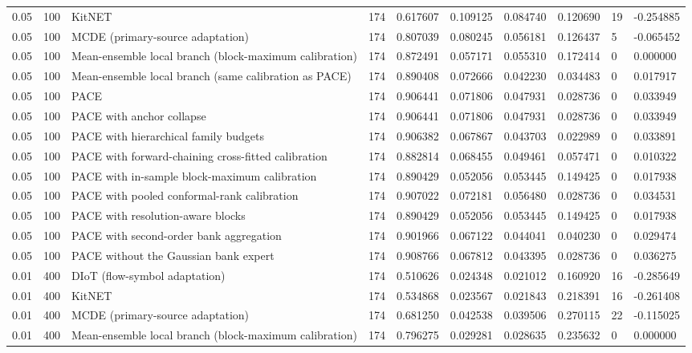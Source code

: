 \begin{tabular}{llllllllll}
0.05 & 100 & KitNET & 174 & 0.617607 & 0.109125 & 0.084740 & 0.120690 & 19 & -0.254885 \\
0.05 & 100 & MCDE (primary-source adaptation) & 174 & 0.807039 & 0.080245 & 0.056181 & 0.126437 & 5 & -0.065452 \\
0.05 & 100 & Mean-ensemble local branch (block-maximum calibration) & 174 & 0.872491 & 0.057171 & 0.055310 & 0.172414 & 0 & 0.000000 \\
0.05 & 100 & Mean-ensemble local branch (same calibration as PACE) & 174 & 0.890408 & 0.072666 & 0.042230 & 0.034483 & 0 & 0.017917 \\
0.05 & 100 & PACE & 174 & 0.906441 & 0.071806 & 0.047931 & 0.028736 & 0 & 0.033949 \\
0.05 & 100 & PACE with anchor collapse & 174 & 0.906441 & 0.071806 & 0.047931 & 0.028736 & 0 & 0.033949 \\
0.05 & 100 & PACE with hierarchical family budgets & 174 & 0.906382 & 0.067867 & 0.043703 & 0.022989 & 0 & 0.033891 \\
0.05 & 100 & PACE with forward-chaining cross-fitted calibration & 174 & 0.882814 & 0.068455 & 0.049461 & 0.057471 & 0 & 0.010322 \\
0.05 & 100 & PACE with in-sample block-maximum calibration & 174 & 0.890429 & 0.052056 & 0.053445 & 0.149425 & 0 & 0.017938 \\
0.05 & 100 & PACE with pooled conformal-rank calibration & 174 & 0.907022 & 0.072181 & 0.056480 & 0.028736 & 0 & 0.034531 \\
0.05 & 100 & PACE with resolution-aware blocks & 174 & 0.890429 & 0.052056 & 0.053445 & 0.149425 & 0 & 0.017938 \\
0.05 & 100 & PACE with second-order bank aggregation & 174 & 0.901966 & 0.067122 & 0.044041 & 0.040230 & 0 & 0.029474 \\
0.05 & 100 & PACE without the Gaussian bank expert & 174 & 0.908766 & 0.067812 & 0.043395 & 0.028736 & 0 & 0.036275 \\
0.01 & 400 & DIoT (flow-symbol adaptation) & 174 & 0.510626 & 0.024348 & 0.021012 & 0.160920 & 16 & -0.285649 \\
0.01 & 400 & KitNET & 174 & 0.534868 & 0.023567 & 0.021843 & 0.218391 & 16 & -0.261408 \\
0.01 & 400 & MCDE (primary-source adaptation) & 174 & 0.681250 & 0.042538 & 0.039506 & 0.270115 & 22 & -0.115025 \\
0.01 & 400 & Mean-ensemble local branch (block-maximum calibration) & 174 & 0.796275 & 0.029281 & 0.028635 & 0.235632 & 0 & 0.000000 \\

\end{tabular}
